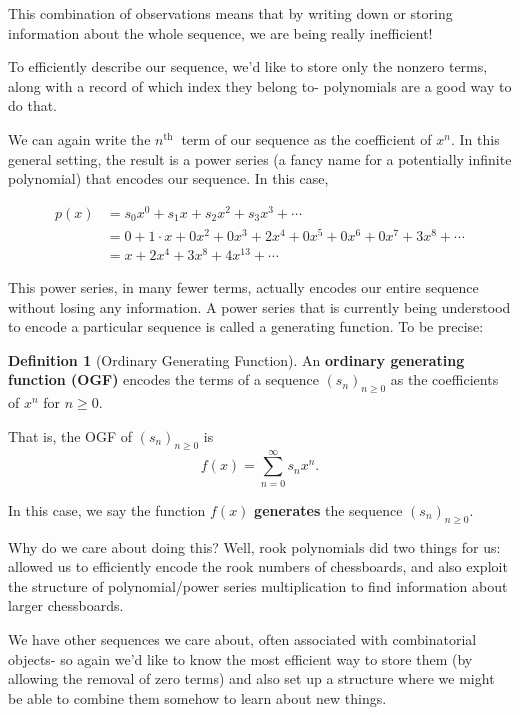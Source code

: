 \documentclass{article}
\theoremstyle{definition}
\newtheorem{definition}{Definition}
\begin{document}
This combination of observations means that by writing down or storing information about the whole sequence, we are being really inefficient!

To efficiently describe our sequence, we'd like to store only the nonzero terms, along with a record of which index they belong to- polynomials are a good way to do that.

We can again write the $n^{\text {th }}$ term of our sequence as the coefficient of $x^{n}$. In this general setting, the result is a power series (a fancy name for a potentially infinite polynomial) that encodes our sequence. In this case,

$$
\begin{aligned}
p(x) & =s_{0} x^{0}+s_{1} x+s_{2} x^{2}+s_{3} x^{3}+\cdots \\
& =0+1 \cdot x+0 x^{2}+0 x^{3}+2 x^{4}+0 x^{5}+0 x^{6}+0 x^{7}+3 x^{8}+\cdots \\
& =x+2 x^{4}+3 x^{8}+4 x^{13}+\cdots
\end{aligned}
$$

This power series, in many fewer terms, actually encodes our entire sequence without losing any information. A power series that is currently being understood to encode a particular sequence is called a generating function. To be precise:

\begin{definition}[Ordinary Generating Function]
An \textbf{ordinary generating function (OGF)} encodes the terms of a sequence $\left(s_{n}\right)_{n \geq 0}$ as the coefficients of $x^{n}$ for $n \geq 0$.

That is, the OGF of $\left(s_{n}\right)_{n \geq 0}$ is 
\[f(x)=\sum_{n=0}^{\infty} s_{n} x^{n}.\]

In this case, we say the function $f(x)$ \textbf{generates} the sequence $\left(s_{n}\right)_{n \geq 0}$.
\end{definition}

Why do we care about doing this? Well, rook polynomials did two things for us: allowed us to efficiently encode the rook numbers of chessboards, and also exploit the structure of polynomial/power series multiplication to find information about larger chessboards.

We have other sequences we care about, often associated with combinatorial objects- so again we'd like to know the most efficient way to store them (by allowing the removal of zero terms) and also set up a structure where we might be able to combine them somehow to learn about new things.
\end{document}
